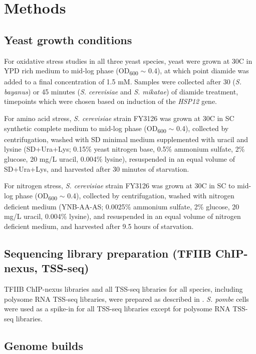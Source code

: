 \section{Methods}

\subsection{Yeast growth conditions}
\label{subsec:stress_growth_conditions}

For oxidative stress studies in all three yeast species, yeast were grown at 30\textdegree C in YPD rich medium to mid-log phase (OD\textsubscript{600} $\sim$ 0.4), at which point diamide was added to a final concentration of 1.5 mM.
Samples were collected after 30 (\textit{S. bayanus}) or 45 minutes (\textit{S. cerevisiae} and \textit{S. mikatae}) of diamide treatment, timepoints which were chosen based on induction of the \textit{HSP12} gene.

For amino acid stress, \textit{S. cerevisiae} strain FY3126 was grown at 30\textdegree C in SC synthetic complete medium to mid-log phase (OD\textsubscript{600} $\sim$ 0.4), collected by centrifugation, washed with SD minimal medium supplemented with uracil and lysine (SD+Ura+Lys; 0.15\% yeast nitrogen base, 0.5\% ammonium sulfate, 2\% glucose, 20 mg/L uracil, 0.004\% lysine), resuspended in an equal volume of SD+Ura+Lys, and harvested after 30 minutes of starvation.

For nitrogen stress, \textit{S. cerevisiae} strain FY3126 was grown at 30\textdegree C in SC to mid-log phase (OD\textsubscript{600} $\sim$ 0.4), collected by centrifugation, washed with nitrogen deficient medium (YNB-AA-AS; 0.0025\% ammonium sulfate, 2\% glucose, 20 mg/L uracil, 0.004\% lysine), and resuspended in an equal volume of nitrogen deficient medium, and harvested after 9.5 hours of starvation.

\subsection{Sequencing library preparation (TFIIB ChIP-nexus, TSS-seq)}

TFIIB ChIP-nexus libraries and all TSS-seq libraries for all species, including polysome RNA TSS-seq libraries, were prepared as described in \citet{doris2018}.
\textit{S. pombe} cells were used as a spike-in for all TSS-seq libraries except for polysome RNA TSS-seq libraries.

\subsection{Genome builds}

